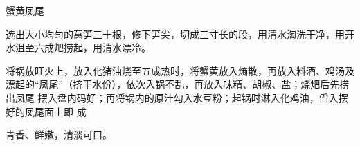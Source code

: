 \begin{recipe}{蟹黄凤尾}

\ingredients


\preparation

\step 选出大小均匀的莴笋三十根，修下笋尖，切成三寸长的段，用清水淘洗干净，用开
水沮至六成𤆵捞起，用清水漂冷。

\step 将锅放旺火上，放入化猪油烧至五成热时，将蟹黄放入熵散，再放入料酒、鸡汤及
漂起的“凤尾”（挤干水份），依次入锅不乱，再放入味精、胡椒、盐；烧𤆵后先捞出凤尾
摆入盘内码好；再将锅内的原汁勾入水豆粉；起锅时淋入化鸡油，舀入摆好的凤尾面上即
成

\features

青香、鲜嫩，清淡可口。

\end{recipe}

